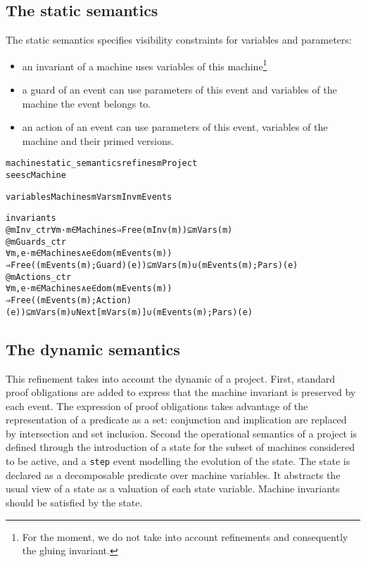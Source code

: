 \documentclass{llncs}
\begin{document}
   \subsection{The static semantics}

The static semantics specifies visibility constraints for variables
and parameters: 
\begin{itemize}
  \item an invariant of a machine uses variables of this machine\footnote{For the moment, we do not take into account refinements and consequently the gluing invariant.}
  \item a guard of an event can use parameters of this event and
    variables of the  machine  the event belongs to.
  \item an action of an event can use parameters of this event,
    variables of the  machine and their primed versions.
\end{itemize}

\begin{framed}
\begin{small}
\begin{alltt}
machine static_semantics refines mProject
sees cMachine

variables Machines mVars mInv mEvents 

invariants
  @mInv_ctr ∀ m · m ∈ Machines ⇒ Free(mInv(m)) ⊆ mVars(m)
  @mGuards_ctr 
     ∀ m,e· m ∈ Machines ∧ e ∈ dom(mEvents(m))
       ⇒ Free((mEvents(m);Guard)(e)) ⊆ mVars(m) ∪ (mEvents(m);Pars)(e)
  @mActions_ctr 
      ∀ m,e· m ∈ Machines ∧ e ∈ dom(mEvents(m))
       ⇒ Free((mEvents(m);Action)(e)) ⊆ mVars(m) ∪ Next[mVars(m)] ∪ (mEvents(m);Pars)(e)
\end{alltt} 
\end{small}
\end{framed}

   \subsection{The dynamic semantics}

This refinement takes into account the dynamic of a project. First,
standard proof obligations are added to express that the machine
invariant is preserved by each event. The expression of proof obligations
takes advantage of the representation of a predicate as a set:
conjunction and implication are replaced by intersection and set inclusion.
Second the operational semantics
of a project is defined through the introduction of a state for the
subset of machines considered to be active, and a \texttt{step} event modelling the evolution of the
state. The state is declared as a decomposable predicate over machine
variables. It abstracts the usual view of a state as a valuation of each state
variable. Machine invariants should be satisfied by the state.
\end{document}
